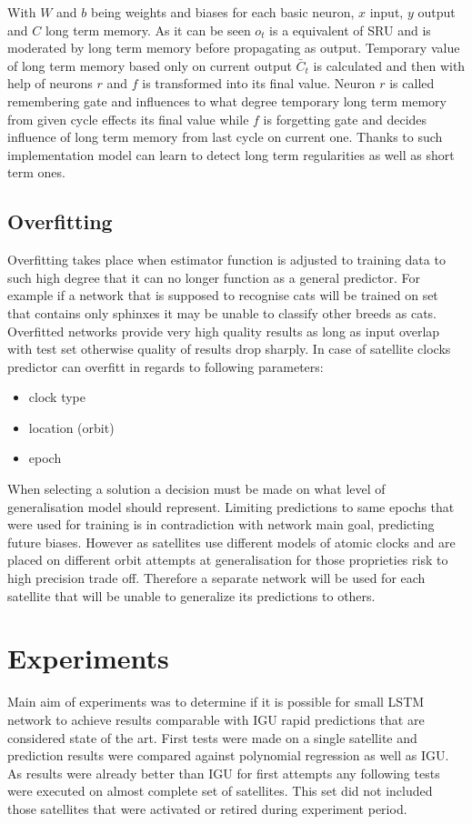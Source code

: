 \documentclass{kybernetika}
\begin{document}
With $W$ and $b$ being weights and biases for each basic neuron, $x$ input, $y$ output and
$C$ long term memory. As it can be seen $o_t$ is a equivalent of SRU and is moderated by
long term memory before propagating as output. Temporary value of long term memory based
only on current output $\bar{C}_t$ is calculated and then with help of neurons $r$ and $f$
is transformed into its final value.
Neuron $r$ is called remembering gate and influences to what degree temporary long term
memory from given cycle effects its final value while $f$ is forgetting gate and
decides influence of long term memory from last cycle on current one.
Thanks to such implementation model can learn to detect long term regularities as well
as short term ones.

\subsection{Overfitting}  
Overfitting takes place when estimator function is adjusted to training data to such high
degree that it can no longer function as a general predictor.
For example if a network that is supposed to recognise cats will be trained on set that contains
only sphinxes it may be unable to classify other breeds as cats.
Overfitted networks provide very high quality results as long as input overlap with test set
otherwise quality of results drop sharply.
In case of satellite clocks predictor can overfitt in regards to following parameters:
\begin{itemize}
\item clock type
\item location (orbit)
\item epoch
\end{itemize}
When selecting a solution a decision must be made on what level of generalisation model should
represent. Limiting predictions to same epochs that were used for training is in contradiction
with network main goal, predicting future biases. However as satellites use different models
of atomic clocks and are placed on different orbit attempts at generalisation for those
proprieties risk to high precision trade off.
Therefore a separate network will be used for each satellite that will be unable to generalize
its predictions to others.

\FloatBarrier
\section{Experiments}
Main aim of experiments was to determine if it is possible for small LSTM network to 
achieve results comparable with IGU rapid predictions that are considered state of the art.
First tests were made on a single satellite and prediction results were compared against 
polynomial regression as well as IGU. As results were already better than IGU for first attempts
any following tests were executed on almost complete set of satellites. This set did not included
those satellites that were activated or retired during experiment period.
\end{document}
